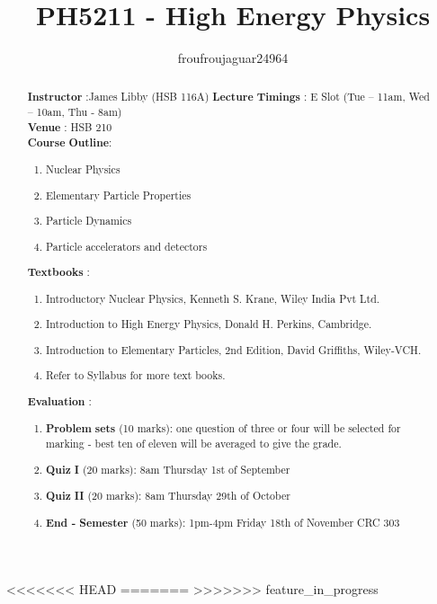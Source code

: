 \documentclass[a4paper]{report}
\author{froufroujaguar24964}
\title{PH5211 - High Energy Physics}
\begin{document}
\maketitle

\begin{abstract}
	\textbf{Instructor} :James Libby (HSB 116A)
	\textbf{Lecture}  \textbf{Timings} : E Slot (Tue – 11am, Wed – 10am, Thu - 8am)\\
	\textbf{Venue} : HSB 210\\
	\textbf{Course}  \textbf{Outline}: \\
	\begin{enumerate}
	\item Nuclear Physics
	\item Elementary Particle Properties
	\item Particle Dynamics
	\item Particle accelerators and detectors
	\end{enumerate}
	
	\textbf{Text}\textbf{books} :
	\begin{enumerate}
		\item Introductory Nuclear Physics, Kenneth S. Krane, Wiley India Pvt Ltd.
		\item Introduction to High Energy Physics, Donald H. Perkins, Cambridge.
		\item Introduction to Elementary Particles, 2nd Edition, David Griffiths, Wiley-VCH.
		\item Refer to Syllabus for more text books.
	\end{enumerate}
	\textbf{Evaluation} :
	\begin{enumerate}
		\item \textbf{Problem}  \textbf{sets} (10 marks): one question of three or four will be selected for marking - best ten of eleven will be averaged to give the grade.
		\item \textbf{Quiz} \textbf{I}  (20 marks): 8am Thursday 1st of September
		\item \textbf{Quiz} \textbf{II}  (20 marks): 8am Thursday 29th of October
		\item \textbf{End -} \textbf{Semester}  (50 marks): 1pm-4pm Friday 18th of November CRC 303
	\end{enumerate}
\end{abstract}

\newpage

\tableofcontents

<<<<<<< HEAD
=======
>>>>>>> feature_in_progress

\newpage
\appendix
\appendixpage



\newpage
\printbibliography
\end{document}
